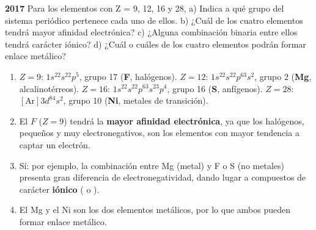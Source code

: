 \begin{exerciseEVAU}
    \textbf{ 2017 } Para los elementos con Z = 9, 12, 16 y 28, a) Indica a qué grupo del sistema periódico pertenece cada uno de ellos. b) ¿Cuál de los cuatro elementos tendrá mayor afinidad electrónica? c) ¿Alguna combinación binaria entre ellos tendrá carácter iónico? d) ¿Cuál o cuáles de los cuatro elementos podrán formar enlace metálico?


    \begin{solu}


        \begin{enumerate}[label=\letraminuscula]
            \item \(Z=9\): \(1s^22s^22p^5\), grupo 17 (\textbf{F}, halógenos). \(Z=12\): \(1s^22s^22p^63s^2\), grupo 2 (\textbf{Mg}, alcalinotérreos). \(Z=16\): \(1s^22s^22p^63s^23p^4\), grupo 16 (\textbf{S}, anfígenos). \(Z=28\): \([\text{Ar}]3d^84s^2\), grupo 10 (\textbf{Ni}, metales de transición).

            \item El \(F\) (\(Z=9\)) tendrá la \textbf{mayor afinidad electrónica}, ya que los halógenos, pequeños y muy electronegativos, son los elementos con mayor tendencia a captar un electrón.

            \item Sí: por ejemplo, la combinación entre Mg (metal) y F o S (no metales) presenta gran diferencia de electronegatividad, dando lugar a compuestos de carácter \textbf{iónico} ( o ).

            \item El Mg y el Ni son los dos elementos metálicos, por lo que ambos pueden formar enlace metálico.
        \end{enumerate}
    \end{solu}
\end{exerciseEVAU}


